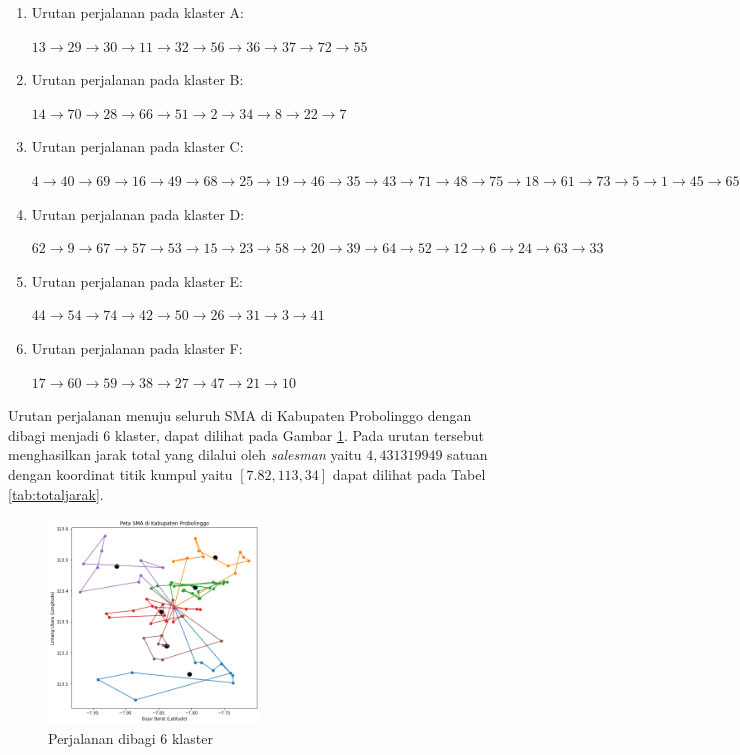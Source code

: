 \begin{enumerate}

\item Urutan perjalanan pada klaster A:

$13\rightarrow29\rightarrow30\rightarrow11\rightarrow32\rightarrow56\rightarrow36\rightarrow37\rightarrow72\rightarrow55$

\item Urutan perjalanan pada klaster B:

$14\rightarrow70\rightarrow28\rightarrow66\rightarrow51\rightarrow2\rightarrow34\rightarrow8\rightarrow22\rightarrow7$

\item Urutan perjalanan pada klaster C:

$4\rightarrow40\rightarrow69\rightarrow16\rightarrow49\rightarrow68\rightarrow25\rightarrow19\rightarrow46\rightarrow35\rightarrow43\rightarrow71\rightarrow48\rightarrow75\rightarrow18\rightarrow61\rightarrow73\rightarrow5\rightarrow1\rightarrow45\rightarrow65$

\item Urutan perjalanan pada klaster D:

$62\rightarrow9\rightarrow67\rightarrow57\rightarrow53\rightarrow15\rightarrow23\rightarrow58\rightarrow20\rightarrow39\rightarrow64\rightarrow52\rightarrow12\rightarrow6\rightarrow24\rightarrow63\rightarrow33$

\item Urutan perjalanan pada klaster E:

$44\rightarrow54\rightarrow74\rightarrow42\rightarrow50\rightarrow26\rightarrow31\rightarrow3\rightarrow41$

\item Urutan perjalanan pada klaster F:

$17\rightarrow60\rightarrow59\rightarrow38\rightarrow27\rightarrow47\rightarrow21\rightarrow10$

\end{enumerate}

Urutan perjalanan menuju seluruh SMA di Kabupaten Probolinggo dengan dibagi menjadi 6 klaster, dapat dilihat pada Gambar \ref{fig:hasil_mtsp6}. Pada urutan tersebut menghasilkan jarak total yang dilalui oleh \textit{salesman} yaitu $4,431319949$ satuan dengan koordinat titik kumpul yaitu $[7.82, 113,34]$ dapat dilihat pada Tabel \ref{tab:totaljarak}.

\begin{figure}[H]
\centering
\includegraphics[width=0.5\textwidth]{Gambar/hasil_mtsp/6}
\caption{Perjalanan dibagi 6 klaster}
\label{fig:hasil_mtsp6}
\end{figure}

